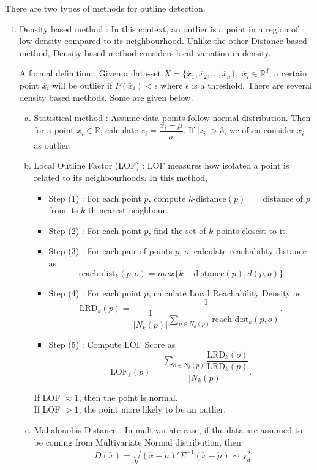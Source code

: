 \documentclass[11pt, a4paper]{article}
\begin{document}
There are two types of methods for outline detection.
\begin{enumerate}[(i)]
\item Density based method : In this context, an outlier is a point in a region of low density compared to its neighbourhood. Unlike the other Distance based method, Density based method considers local variation in density.

A formal definition : Given a data-set $X = \{ \utilde{x_1}, \utilde{x_2}, \ldots, \utilde{x_n} \}, \,\, \utilde{x_i} \in \mathbb{R}^d$, a certain point $\utilde{x_i}$ will be outlier if $P(\utilde{x_i}) < \epsilon$ where $\epsilon$ is a threshold. There are several density based methods. Some are given below.
\begin{enumerate}[(a)]
\item Statistical method : Assume data points follow normal distribution. Then for a point $x_i \in \mathbb{R}$, calculate $z_i = \dfrac{x_i - \mu}{\sigma}$. If $|z_i| > 3$, we often consider $x_i$ as outlier.
\item Local Outline Factor (LOF) : LOF measures how isolated a point is related to its neighbourhoods. In this method,
\begin{itemize}
\item Step (1) : For each point $p$, compute $k$-distance$(p)$ $=$ distance of $p$ from its $k$-th nearest neighbour.
\item Step (2) : For each point $p$, find the set of $k$ points closest to it.
\item Step (3) : For each pair of points $p$, $o$, calculate reachability distance as
$$\text{reach-dist}_k(p, o) = max\{ k-\text{distance}(p), d(p, o)\}$$
\item Step (4) : For each point $p$, calculate Local Reachability Density as
$$\text{LRD}_k(p) = \dfrac{1}{\dfrac{1}{|N_k(p)|} \sum \limits_{o \in N_k(p)} \text{reach-dist}_k(p, o)}.$$
\item Step (5) : Compute LOF Score as
$$\text{LOF}_k(p) = \dfrac{\sum \limits_{o \in N_k(p)} \dfrac{\text{LRD}_k(o)}{\text{LRD}_k(p)}}{|N_k(p)|}.$$
\end{itemize}

If LOF $\approx 1$, then the point is normal.\\[0.2em]
If LOF $> 1$, the point more likely to be an outlier.

\item Mahalonobis Distance : In multivariate case, if the data are assumed to be coming from Multivariate Normal distribution, then
$$D(\utilde{x}) = \sqrt{(\utilde{x} - \utilde{\mu})' \Sigma^{-1}(\utilde{x} - \utilde{\mu})} \sim \chi_{d}^2.$$


\end{enumerate}
\end{enumerate}
\end{document}
